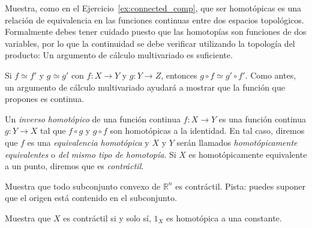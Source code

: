 \documentclass{standalone}
\begin{document}
	\begin{exercise}\label{rem:homotopy_rel_equiv}
		Muestra, como en el Ejercicio~\ref{ex:connected_comp}, que ser homotópicas es una relación de equivalencia en las funciones continuas entre dos espacios topológicos. Formalmente debes tener cuidado puesto que las homotopías son funciones de dos variables, por lo que la continuidad se debe verificar utilizando la topología del producto: Un argumento de cálculo multivariado es suficiente.
	\end{exercise}
	
	\begin{exercise}\label{prop:homotopies_preserve_composition}
		Si $f\simeq f'$ y $g\simeq g'$ con $f\colon X\rightarrow Y$ y $g:Y\rightarrow Z$, entonces $g\circ f\simeq g'\circ f'$. Como antes, un argumento de cálculo multivariado ayudará a mostrar que la función que propones es continua.
	\end{exercise}
		
	
	\begin{definition}\label{defn:homotopy_equivalence}
		Un \emph{inverso homotópico} de una función continua $f:X\rightarrow Y$ es una función continua $g:Y\rightarrow X$ tal que $f\circ g$ y $g\circ f$ son homotópicas a la identidad. En tal caso, diremos que $f$ es una \emph{equivalencia homotópica} y $X$ y $Y$ serán llamados \emph{homotópicamente equivalentes} o \emph{del mismo tipo de homotopía}. Si $X$ es homotópicamente equivalente a un punto, diremos que es \emph{contráctil}.
	\end{definition}
	
	\begin{exercise}
		Muestra que todo subconjunto convexo de $\mathbb{R}^{n}$ es contráctil. Pista: puedes suponer que el origen está contenido en el subconjunto.
	\end{exercise}
	
	\begin{exercise}
		Muestra que $X$ es contráctil si y solo sí, $1_{X}$ es homotópica a una constante.
	\end{exercise}
	
\end{document}
